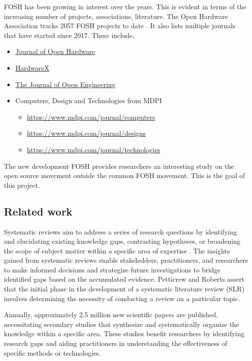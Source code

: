 \documentclass[final-report.tex]{subfiles}
\begin{document}
FOSH has been growing in interest over the years. 
This is evident in terms of the increasing number of projects, associations, literature. 
The Open Hardware Association tracks 
2057 
FOSH projects to date \cite{OSH_association_def}.
It also lists multiple journals that have started since 2017.
These include, 
\begin{itemize}
    \item \href{https://openhardware.metajnl.com/}{Journal of Open Hardware}
    \item \href{https://www.sciencedirect.com/journal/hardwarex}{HardwareX}
    \item \href{https://www.tjoe.org/}{The Journal of Open Engineering}
    \item Computers, Design and Technologies from MDPI
        \begin{itemize}
            \item \href{Computers}{https://www.mdpi.com/journal/computers}
            \item \href{Designs}{https://www.mdpi.com/journal/designs}
            \item \href{Technologies}{https://www.mdpi.com/journal/technologies}
        \end{itemize}
\end{itemize}

The new development FOSH provides researchers an interesting study on the open source movement outside the common FOSH movement. 
This is the goal of this project. 

\subsection{Related work}
Systematic reviews aim to address a series of research questions by identifying and elucidating existing knowledge gaps, contrasting hypotheses, or broadening the scope of subject matter within a specific area of expertise \cite{gough2017introduction}. 
The insights gained from systematic reviews enable stakeholders, practitioners, and researchers to make informed decisions and strategize future investigations to bridge identified gaps based on the accumulated evidence. 
Petticrew and Roberts \cite{petticrew2008systematic} assert that the initial phase in the development of a systematic literature review (SLR) involves determining the necessity of conducting a review on a particular topic.

Annually, approximately 2.5 million new scientific papers are published, necessitating secondary studies that synthesize and systematically organize the knowledge within a specific area. 
These studies benefit researchers by identifying research gaps and aiding practitioners in understanding the effectiveness of specific methods or technologies.
\end{document}
